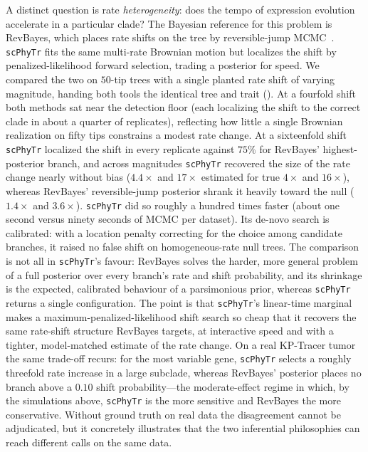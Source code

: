 \documentclass{article}
\newcommand{\scphytr}{\texttt{scPhyTr}}
\begin{document}
A distinct question is rate \emph{heterogeneity}: does the tempo of expression evolution
accelerate in a particular clade? The Bayesian reference for this problem is RevBayes, which
places rate shifts on the tree by reversible-jump MCMC~\cite{hohna_revbayes_2016}. \scphytr{}
fits the same multi-rate Brownian motion but localizes the shift by penalized-likelihood
forward selection, trading a posterior for speed. We compared the two on $50$-tip trees with
a single planted rate shift of varying magnitude, handing both tools the identical tree and
trait (). At a fourfold shift both methods sat near the detection floor
(each localizing the shift to the correct clade in about a quarter of replicates), reflecting
how little a single Brownian realization on fifty tips constrains a modest rate change. At a
sixteenfold shift \scphytr{} localized the shift in every replicate against $75\%$ for
RevBayes' highest-posterior branch, and across magnitudes \scphytr{} recovered the size of
the rate change nearly without bias ($4.4\times$ and $17\times$ estimated for true $4\times$
and $16\times$), whereas RevBayes' reversible-jump posterior shrank it heavily toward the
null ($1.4\times$ and $3.6\times$). \scphytr{} did so roughly a hundred times faster (about
one second versus ninety seconds of MCMC per dataset). Its de-novo search is calibrated: with
a location penalty correcting for the choice among candidate branches, it raised no false
shift on homogeneous-rate null trees. The comparison is not all in \scphytr{}'s favour:
RevBayes solves the harder, more general problem of a full posterior over every branch's
rate and shift probability, and its shrinkage is the expected, calibrated behaviour of a
parsimonious prior, whereas \scphytr{} returns a single configuration. The point is that
\scphytr{}'s linear-time marginal makes a maximum-penalized-likelihood shift search so cheap
that it recovers the same rate-shift structure RevBayes targets, at interactive speed and
with a tighter, model-matched estimate of the rate change. On a real KP-Tracer tumor the same
trade-off recurs: for the most variable gene, \scphytr{} selects a roughly threefold rate
increase in a large subclade, whereas RevBayes' posterior places no branch above a $0.10$
shift probability---the moderate-effect regime in which, by the simulations above,
\scphytr{} is the more sensitive and RevBayes the more conservative. Without ground truth on
real data the disagreement cannot be adjudicated, but it concretely illustrates that the two
inferential philosophies can reach different calls on the same data.
\end{document}

